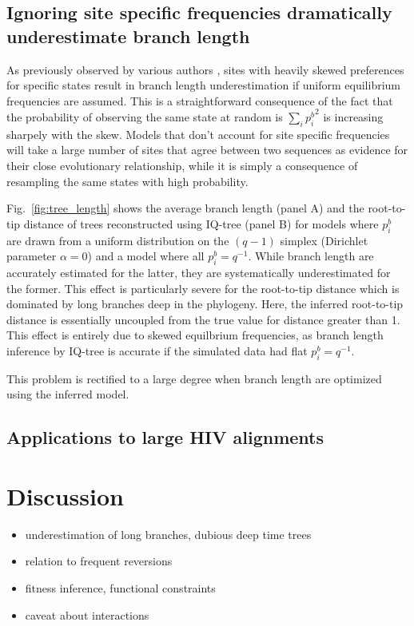 \documentclass[aps,rmp, onecolumn]{revtex4}
\newcommand{\eqp}{p}
\begin{document}
\subsection*{Ignoring site specific frequencies dramatically underestimate branch length}
As previously observed by various authors \citet{halpern_evolutionary_1998,hilton_modeling_2018}, sites with heavily skewed preferences for specific states result in branch length underestimation if uniform equilibrium frequencies are assumed.
This is a straightforward consequence of the fact that the probability of observing the same state at random is $\sum_i{\eqp_i^b}^2$ is increasing sharpely with the skew.
Models that don't account for site specific frequencies will take a large number of sites that agree between two sequences as evidence for their close evolutionary relationship, while it is simply a consequence of resampling the same states with high probability.

Fig.~\ref{fig:tree_length} shows the average branch length (panel A) and the root-to-tip distance of trees reconstructed using IQ-tree (panel B) for models where $p_i^b$ are drawn from a uniform distribution on the $(q-1)$ simplex (Dirichlet parameter $\alpha=0$) and a model where all $\eqp_i^b=q^{-1}$.
While branch length are accurately estimated for the latter, they are systematically underestimated for the former.
This effect is particularly severe for the root-to-tip distance which is dominated by long branches deep in the phylogeny.
Here, the inferred root-to-tip distance is essentially uncoupled from the true value for distance greater than 1.
This effect is entirely due to skewed equilbrium frequencies, as branch length inference by IQ-tree is accurate if the simulated data had flat $\eqp_i^b=q^{-1}$.

This problem is rectified to a large degree when branch length are optimized using the inferred model.



\subsection*{Applications to large HIV alignments}


\section*{Discussion}

\begin{itemize}
	\item underestimation of long branches, dubious deep time trees
	\item relation to frequent reversions
	\item fitness inference, functional constraints
	\item caveat about interactions
\end{itemize}


\end{document}
